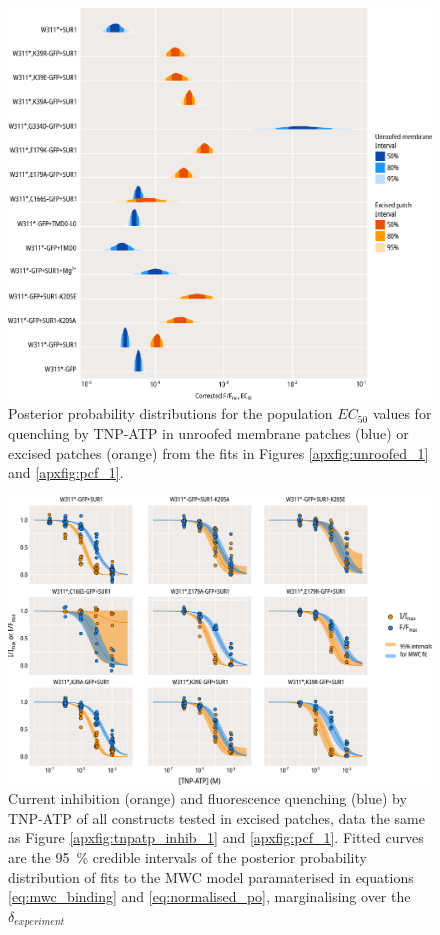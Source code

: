 \begin{figure}[h]
	\centering
	\includegraphics[width=\textwidth]{all_binding_params.pdf}
	\caption[Fluorescence quenching EC\textsubscript{50} posterior distributions]{
	{\bf{}}
	Posterior probability distributions for the population $EC_{50}$ values for quenching by TNP-ATP in unroofed membrane patches (blue) or excised patches (orange) from the fits in Figures \ref{apxfig:unroofed_1} and \ref{apxfig:pcf_1}.
	}
	\label{apxfig:binding_params}
\end{figure}

\begin{figure}[h]
	\centering
	\includegraphics[width=\textwidth]{all_pcf_fits_1.pdf}
	\caption[MWC population fits]{
	{\bf{}}
	Current inhibition (orange) and fluorescence quenching (blue) by TNP-ATP of all constructs tested in excised patches, data the same as Figure \ref{apxfig:tnpatp_inhib_1} and \ref{apxfig:pcf_1}.
	Fitted curves are the \SI{95}{\percent} credible intervals of the posterior probability distribution of fits to the MWC model paramaterised in equations \ref{eq:mwc_binding} and \ref{eq:normalised_po}, marginalising over the $\delta_{experiment}$
	}
	\label{apxfig:pcf_3}
\end{figure}

